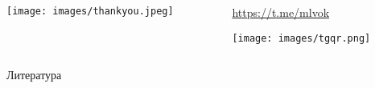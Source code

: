 \documentclass[11pt,aspectratio=169,handout]{beamer}
\begin{document}
\begin{frame}{}

\begin{columns}
\begin{column}{0.5\textwidth}
   \begin{center}
                \texttt{[image: images/thankyou.jpeg]}
   \end{center}
\end{column}
\begin{column}{0.4\textwidth}
   \begin{center}
                \url{https://t.me/mlvok}

                \texttt{[image: images/tgqr.png]}
   \end{center}
\end{column}
\end{columns}

\end{frame}

\begin{frame}[allowframebreaks]{Литература}




\end{frame}
\end{document}
